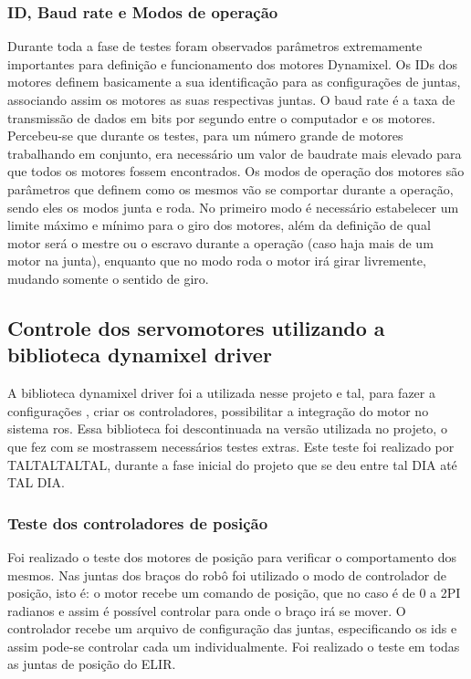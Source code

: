 \subsubsection{ ID, Baud rate e Modos de operação}
Durante toda a fase de testes foram observados parâmetros extremamente importantes para definição e funcionamento dos motores Dynamixel. Os IDs dos motores definem basicamente a sua identificação para as configurações de juntas, associando assim os motores as suas respectivas juntas. 
O baud rate é a taxa de transmissão de dados em bits por segundo entre o computador e os motores. Percebeu-se que durante os testes, para um número grande de motores trabalhando em conjunto, era necessário um valor de baudrate mais elevado para que todos os motores fossem encontrados. 
Os modos de operação dos motores são parâmetros que definem como os mesmos vão se comportar durante a operação, sendo eles os modos junta e roda. No primeiro modo é necessário estabelecer um limite máximo e mínimo para o giro dos motores, além da definição de qual  motor será o mestre ou o escravo durante a operação (caso haja mais de um motor na junta), enquanto que no modo roda o motor irá girar livremente, mudando somente o sentido de giro. 

\subsection{Controle dos servomotores utilizando a biblioteca dynamixel driver}
A biblioteca dynamixel driver foi a utilizada nesse projeto e tal, para fazer a configurações , criar os controladores, possibilitar a integração do motor no sistema ros. Essa biblioteca foi descontinuada na versão utilizada no projeto, o que fez com se mostrassem necessários testes extras. Este teste foi realizado por TALTALTALTAL, durante a fase inicial do projeto que se deu entre tal DIA até TAL DIA.
\subsubsection{Teste dos controladores de posição}
Foi realizado o teste dos motores de posição para verificar o comportamento dos mesmos. Nas juntas dos braços do robô foi utilizado o modo de controlador de posição, isto é: o motor recebe um comando de posição, que no caso é de 0 a 2PI radianos e assim é possível controlar para  onde o braço irá se mover. 
O controlador recebe um arquivo de configuração das juntas, especificando os ids e assim pode-se controlar cada um individualmente. Foi realizado o teste em todas as juntas de posição do ELIR.

